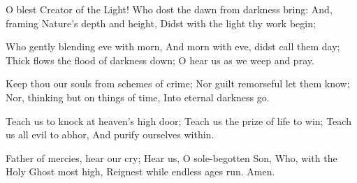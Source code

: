 \documentclass[letterpaper,12pt]{article} %
\begin{document}
{
\def\greinitialformat#1{%
{\fontsize{38}{38}\selectfont #1}%
}

\large%
}
\begin{multicols}{2}
\begin{psalmverses}
{\item O blest Creator of the Light!
Who dost the dawn from darkness bring:
And, framing Nature's depth and height,
Didst with the light thy work begin;
\item Who gently blending eve with morn,
And morn with eve, didst call them day;
Thick flows the flood of darkness down;
O hear us as we weep and pray.
\item Keep thou our souls from schemes of crime;
Nor guilt remorseful let them know;
Nor, thinking but on things of time,
Into eternal darkness go.
\item Teach us to knock at heaven's high door;
Teach us the prize of life to win;
Teach us all evil to abhor,
And purify ourselves within.
\item Father of mercies, hear our cry;
Hear us, O sole-begotten Son,
Who, with the Holy Ghost most high,
Reignest while endless ages run.
Amen.}
\end{psalmverses}
\end{multicols}
{ }
\vspace{-2ex}
{}
\end{document}

